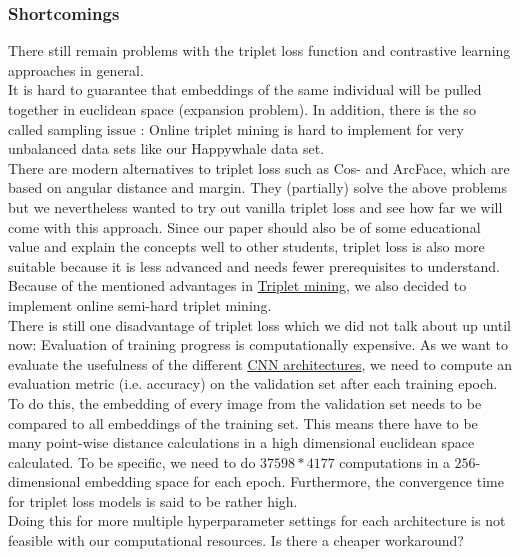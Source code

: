 \subsubsection{Shortcomings}
There still remain problems with the triplet loss function and contrastive learning approaches in general. \\
It is hard to guarantee that embeddings of the same individual will be pulled together in euclidean space (expansion problem). In addition, there is the so called sampling issue \cite{hav4ik2021deepmetriclearning}: Online triplet mining is hard to implement for very unbalanced data sets like our Happywhale data set. \\
There are modern alternatives to triplet loss such as Cos- and ArcFace, which are based on angular distance and margin. They (partially) solve the above problems but we nevertheless wanted to try out vanilla triplet loss and see how far we will come with this approach. Since our paper should also be of some educational value and explain the concepts well to other students, triplet loss is also more suitable because it is less advanced and needs fewer prerequisites to understand. \\
Because of the mentioned advantages in \hyperref[subsec:mining]{Triplet mining}, we also decided to implement online semi-hard triplet mining. \\
There is still one disadvantage of triplet loss which we did not talk about up until now: Evaluation of training progress is computationally expensive. As we want to evaluate the usefulness of the different \hyperref[subsec:cnn]{CNN architectures}, we need to compute an evaluation metric (i.e. accuracy) on the validation set after each training epoch. To do this, the embedding of every image from the validation set needs to be compared to all embeddings of the training set. This means there have to be many point-wise distance calculations in a high dimensional euclidean space calculated. To be specific, we need to do $37598 *  4177$ computations in a $256$-dimensional embedding space for each epoch. Furthermore, the convergence time for triplet loss models is said to be rather high. \\
Doing this for more multiple hyperparameter settings for each architecture is not feasible with our computational resources. Is there a cheaper workaround?

